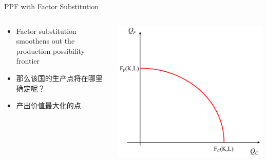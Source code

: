 \documentclass[10pt,hyperref={CJKbookmarks=true},xcolor=dvipsnames,aspectratio=169]{beamer}
\begin{document}
\begin{frame}{PPF with Factor Substitution}


\begin{columns}[onlytextwidth]
\begin{column}{0.5\textwidth}
\begin{itemize}
\item Factor substitution smoothens out the production possibility frontier 
\item 那么该国的生产点将在哪里确定呢？
\item 产出价值最大化的点

\end{itemize}

\end{column}
\begin{column}{0.5\textwidth}
\includegraphics[width=\columnwidth]{fig/ho/lec5-7}
\end{column}
\end{columns}

\end{frame}
\end{document}
